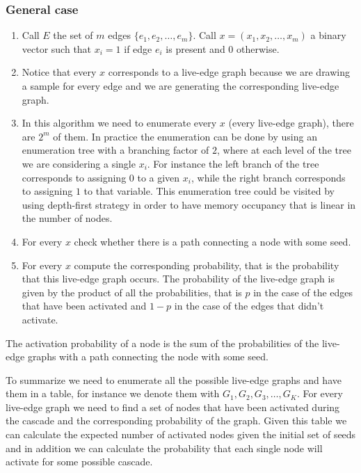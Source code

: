 \documentclass[10pt,a4paper]{article}
\begin{document}
\subsubsection{General case}\label{general-case}
\begin{shaded}
\begin{enumerate}
\item Call $E$ the set of $m$ edges $\{e_1, e_2, \ldots, e_m \}$. Call $x = (x_1, x_2, \ldots, x_m)$ a binary vector such that $x_i = 1$ if edge $e_i$ is present and $0$ otherwise.
\item Notice that every $x$ corresponds to a live-edge graph because we are drawing a sample for every edge and we are generating the corresponding live-edge graph.
\item In this algorithm we need to enumerate every $x$ (every live-edge graph), there are $2^m$ of them. In practice the enumeration can be done by using an enumeration tree with a branching factor of $2$, where at each level of the tree we are considering a single $x_i$. For instance the left branch of the tree corresponds to assigning $0$ to a given $x_i$, while the right branch corresponds to assigning $1$ to that variable. This enumeration tree could be visited by using depth-first strategy in order to have memory occupancy that is linear in the number of nodes.
\item For every $x$ check whether there is a path connecting a node with some seed.
\item For every $x$ compute the corresponding probability, that is the probability that this live-edge graph occurs. The probability of the live-edge graph is given by the product of all the probabilities, that is $p$ in the case of the edges that have been activated and $1-p$ in the case of the edges that didn't activate.
\end{enumerate}
\end{shaded}

The activation probability of a node is the sum of the probabilities of the live-edge graphs with a path connecting the node with some seed.

To summarize we need to enumerate all the possible live-edge graphs and have them in a table, for instance we denote them with $G_1, G_2, G_3, \ldots, G_K$. For every live-edge graph we need to find a set of nodes that have been activated during the cascade and the corresponding probability of the graph. Given this table we can calculate the expected number of activated nodes given the initial set of seeds and in addition we can calculate the probability that each single node will activate for some possible cascade.
\end{document}

